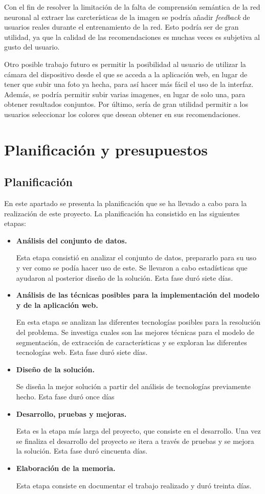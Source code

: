 \documentclass[12pt]{report} %
\begin{document}
	Con el fin de resolver la limitación de la falta de comprensión semántica de la red neuronal al extraer las carcterísticas de la imagen se podría añadir
	\textit{feedback} de usuarios reales durante el entrenamiento de la red. Esto podría ser de gran utilidad, ya que la calidad de las recomendaciones es muchas veces
	es subjetiva al gusto del usuario. 
	
	Otro posible trabajo futuro es permitir la posibilidad al usuario de utilizar la cámara del dispositivo desde el que se acceda a la aplicación web, 
	en lugar de tener que subir una foto ya hecha, para así hacer más fácil el uso de la interfaz. Además, se podría permitir subir varias imagenes,
	en lugar de solo una, para obtener resultados conjuntos. Por último, sería de gran utilidad permitir a los usuarios seleccionar los colores que desean
	obtener en sus recomendaciones.


	\chapter{Planificación y presupuestos}

	\section{Planificación}


	En este apartado se presenta la planificación que se ha llevado a cabo para la realización de este proyecto.
	La planificación ha consistido en las siguientes etapas:
	\begin{itemize}
		\item \textbf{Análisis del conjunto de datos.} 
		
		Esta etapa consistió en analizar el conjunto de datos, prepararlo para su uso y ver como se podía hacer uso de este. Se
		llevaron a cabo estadísticas que ayudaron al posterior diseño de la solución. Esta fase duró siete días.
		\item \textbf{Análisis de las técnicas posibles para la implementación del modelo y de la aplicación web.} 
		
		En esta etapa se analizan las diferentes tecnologías posibles para la resolución del problema. Se investiga
		cuales son las mejores técnicas para el modelo de segmentación, de extracción de características y se exploran las diferentes tecnologías web.
		Esta fase duró siete días.
		\item \textbf{Diseño de la solución.} 
		
		Se diseña la mejor solución a partir del análisis de tecnologías previamente hecho. Esta fase duró once días
		\item \textbf{Desarrollo, pruebas y mejoras.}
		
		Esta es la etapa más larga del proyecto, que consiste en el desarrollo. Una vez se finaliza el desarrollo
		del proyecto se itera a través de pruebas y se mejora la solución. 
		Esta fase duró cincuenta días.
		\item \textbf{Elaboración de la memoria.}
		
		Esta etapa consiste en documentar el trabajo realizado y duró treinta días.
	\end{itemize}
\end{document}
